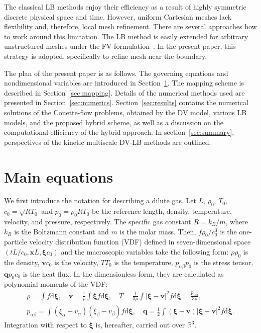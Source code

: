 \documentclass{elsarticle} %
\newcommand{\dd}{\mathrm{d}}
\newcommand{\dxi}{\dd{\boldsymbol{\xi}}}
\newcommand{\bxi}{\boldsymbol{\xi}}
\newcommand{\bv}{\boldsymbol{v}}
\newcommand{\bq}{\boldsymbol{q}}
\newcommand{\bx}{\boldsymbol{x}}
\newcommand{\refer}[1]{#1_0}
\begin{document}
The classical LB methods enjoy their efficiency as a result of highly symmetric discrete physical space and time.
However, uniform Cartesian meshes lack flexibility and, therefore, local mesh refinement.
There are several approaches how to work around this limitation.
The LB method is easily extended for arbitrary unstructured meshes
under the FV formulation~\cite{Succi1992, Peng1999, Patil2009, Li2016}.
In the present paper, this strategy is adopted, specifically to refine mesh near the boundary.

The plan of the present paper is as follows.
The governing equations and nondimensional variables are introduced in Section~\ref{sec:equations}.
The mapping scheme is described in Section~\ref{sec:mapping}.
Details of the numerical methods used are presented in Section~\ref{sec:numerics}.
Section~\ref{sec:results} contains the numerical solutions of the Couette-flow problems, %
obtained by the DV model, various LB models, and the proposed hybrid scheme,
as well as a discussion on the computational efficiency of the hybrid approach.
In section~\ref{sec:summary}, perspectives of the kinetic multiscale DV-LB methods are outlined.

\section{Main equations}\label{sec:equations}

We first introduce the notation for describing a dilute gas.
Let \(L\), \(\refer\rho\), \(\refer{T}\), \(\refer{c} = \sqrt{R\refer{T}}\) and \(\refer{p} = \refer{\rho}R\refer{T}\) be
the reference length, density, temperature, velocity, and pressure, respectively.
The specific gas constant \(R = k_B/m\), where \(k_B\) is the Boltzmann constant and \(m\) is the molar mass.
Then, \(f\refer{\rho}/\refer{c}^3\) is the one-particle velocity distribution function (VDF)
defined in seven-dimensional space \((tL/\refer{c}, \bx L, \bxi \refer{c})\) and
the macroscopic variables take the following form:
\(\rho\refer{\rho}\) is the density, \(\bv\refer{c}\) is the velocity, \(T\refer{T}\) is the temperature,
\(p_{\alpha\beta}\refer{p}\) is the stress tensor, \(\bq\refer{p}\refer{c}\) is the heat flux.
In the dimensionless form, they are calculated as polynomial moments of the VDF:
\begin{equation}\label{eq:macro}
    \begin{gathered}
    \rho = \int f \dxi, \quad
    \bv = \frac1{\rho} \int \bxi f \dxi, \quad
    T = \frac{1}{3\rho}\int|\bxi-\bv|^2f \dxi = \frac{p_{\alpha\alpha}}{3\rho}, \\
    p_{\alpha\beta} = \int(\xi_\alpha - v_\alpha)(\xi_\beta - v_\beta) f \dxi, \quad
    \bq = \frac12\int(\bxi-\bv)|\bxi-\bv|^2 f \dxi.
    \end{gathered}
\end{equation}
Integration with respect to \(\bxi\) is, hereafter, carried out over \(\mathbb{R}^3\).
\end{document}
